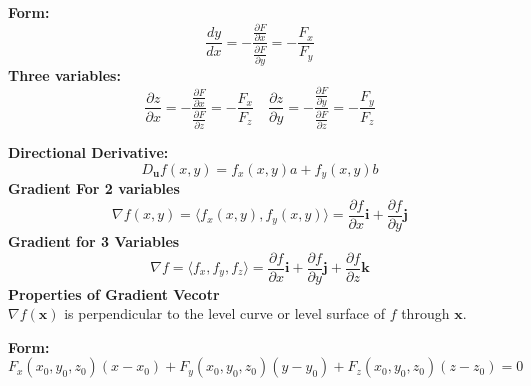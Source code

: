 \documentclass[2pt]{article}
\begin{document}
\begin{multicols}{2}
\begin{tcolorbox}[title=\textbf{Implicit Differentiation}, colframe=lightblue]
    \textbf{Form:} 	
    \[ \frac{dy}{dx} = -\frac{\frac{\partial F}{\partial x}}{\frac{\partial F}{\partial y}} = -\frac{F_x}{F_y} \]
    \textbf{Three variables:}
    \[ \frac{\partial z}{\partial x} = -\frac{\frac{\partial F}{\partial x}}{\frac{\partial F}{\partial z}} = -\frac{F_x}{F_z} \quad \frac{\partial z}{\partial y} = -\frac{\frac{\partial F}{\partial y}}{\frac{\partial F}{\partial z}} = -\frac{F_y}{F_z} \]
\end{tcolorbox}

\begin{tcolorbox}[title=\textbf{Directional Derivative and Gradient Vector}, colframe=lightblue]
    \textbf{Directional Derivative:} 	
    \[ D_{\mathbf{u}} f(x, y) = f_x(x, y) a + f_y(x, y) b \] 
    \textbf{Gradient For 2 variables}
    \[ \nabla f(x, y) = \langle f_x(x, y), f_y(x, y) \rangle = \frac{\partial f}{\partial x} \mathbf{i} + \frac{\partial f}{\partial y} \mathbf{j} \]
    \textbf{Gradient for 3 Variables} 
    \[ \nabla f = \langle f_x, f_y, f_z \rangle = \frac{\partial f}{\partial x} \mathbf{i} + \frac{\partial f}{\partial y} \mathbf{j} + \frac{\partial f}{\partial z} \mathbf{k} \] 
    \textbf{Properties of Gradient Vecotr} \\
    \( \nabla f(\mathbf{x}) \) is perpendicular to the level curve or level surface of \( f \) through \( \mathbf{x} \). \\

\end{tcolorbox}

\begin{tcolorbox}[title=\textbf{Tange Planes and Surfaces}, colframe=lightblue]
    \textbf{Form:} 	
    \[ \scriptstyle F_x(x_0, y_0, z_0)(x - x_0) + F_y(x_0, y_0, z_0)(y - y_0) + F_z(x_0, y_0, z_0)(z - z_0) = 0  \]
\end{tcolorbox}

\end{multicols}
\end{document}
